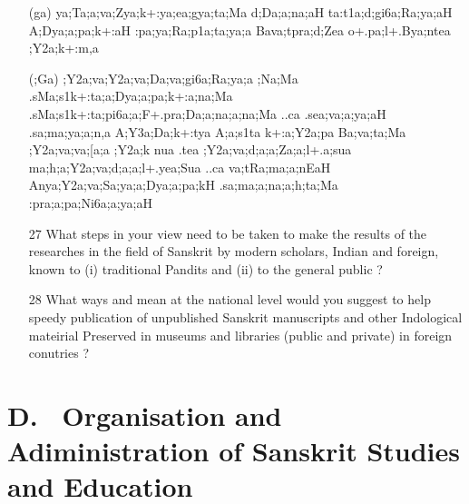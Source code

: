 \begin{itemize}
\begin{itemize}
                 \item[({\sktf ga})] {\sktf ya;Ta;a;va;Zya;k+:ya;ea;gya;ta;Ma
d;Da;a;na;aH ta:t1a;d;gi6a;Ra;ya;aH A;Dya;a;pa;k+:aH
:pa;ya;Ra;p1a;ta;ya;a Ba{va};tpra;d;Zea o+.pa;l+.Bya;ntea ;Y2a;k+:m,a}
                 
                 \item[({\sktf ;Ga})] {\sktf ;Y2a;va;Y2a;va;Da;va;gi6a;Ra;ya;a%
;Na;Ma .sMa;s1k+:ta;a;Dya;a;pa;k+:a;na;Ma
.sMa;s1k+:ta;pi6a;a;F+.pra;Da;a;na;a;na;Ma {..ca} .sea{;va;a};ya;aH .sa;ma;ya;a;n,a A;Y3a;Da;k+:tya
A;a;s1ta k+:a;Y2a;pa Ba;va;ta;Ma ;Y2a;va;va;[a;a
;Y2a;k nua .tea ;Y2a;va;d;a;a;Za;a;l+.a;sua
ma;h;a;Y2a;va;d;a;a;l+.yea;Sua ..ca va;tRa;ma;a;nEaH A{nya}{;Y2a;va};Sa;ya;a;Dya;a;pa;kH
.sa;ma;a;na;a;h;ta;Ma :pra;a;pa;Ni6a;a;ya;aH}  
                 \end{itemize}
\end{itemize}

{\rm 
\begin{itemize}
\item[27] What steps in your view need to be taken to make the results of the researches in the field of Sanskrit by modern scholars, Indian and foreign, known to (i) traditional Pandits and (ii) to the general public ?

\item[28] What ways and mean at the national level would you suggest to help speedy publication of unpublished Sanskrit manuscripts and other Indological mateirial Preserved in museums and libraries (public and private) in foreign conutries ?
\end{itemize}
}

\section*{{\rm D.~ Organisation and Adiministration of Sanskrit Studies and Education}}

